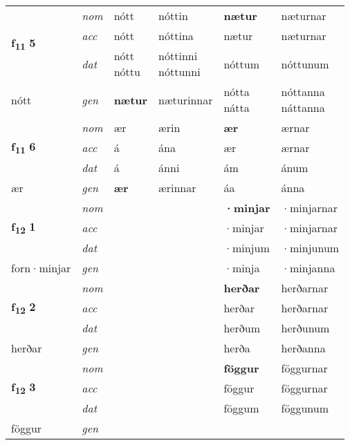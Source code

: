 \begin{longtable}[l]{X>{\footnotesize\itshape}XXXXX}
\multirow{3}{*}{{{\textbf{f{\textsubscript{11}}} \Large{\textbf{5}}}}} & nom & nótt & nóttin & \textbf{nætur} & næturnar \\*
 & acc & nótt & nóttina & nætur & næturnar \\*
 & dat & \specialcell{nótt\\ nóttu} & \specialcell{nóttinni\\ nóttunni} & nóttum & nóttunum \\*
 {\footnotesize{nótt}} & gen & \textbf{nætur} & næturinnar & \specialcell{nótta\\ nátta} & \specialcell{nóttanna\\ náttanna} \\
\cmidrule{1-6}

\multirow{3}{*}{{{\textbf{f{\textsubscript{11}}} \Large{\textbf{6}}}}} & nom & ær & ærin & \textbf{ær} & ærnar \\*
 & acc & á & ána & ær & ærnar \\*
 & dat & á & ánni & ám & ánum \\*
 {\footnotesize{ær}} & gen & \textbf{ær} & ærinnar & áa & ánna \\
\cmidrule{1-6}

\multirow{3}{*}{{{\textbf{f{\textsubscript{12}}} \Large{\textbf{1}}}}} & nom &  &  & \textbf{·minjar} & ·minjarnar \\*
 & acc &  &  & ·minjar & ·minjarnar \\*
 & dat &  &  & ·minjum & ·minjunum \\*
 {\footnotesize{forn\allowbreak ·minjar}} & gen & \textbf{} &  & ·minja & ·minjanna \\
\cmidrule{1-6}

\multirow{3}{*}{{{\textbf{f{\textsubscript{12}}} \Large{\textbf{2}}}}} & nom &  &  & \textbf{herðar} & herðarnar \\*
 & acc &  &  & herðar & herðarnar \\*
 & dat &  &  & herðum & herðunum \\*
 {\footnotesize{herðar}} & gen & \textbf{} &  & herða & herðanna \\
\cmidrule{1-6}

\multirow{3}{*}{{{\textbf{f{\textsubscript{12}}} \Large{\textbf{3}}}}} & nom &  &  & \textbf{föggur} & föggurnar \\*
 & acc &  &  & föggur & föggurnar \\*
 & dat &  &  & föggum & föggunum \\*
 {\footnotesize{föggur}} & gen & \textbf{} &  &  &  \\
\cmidrule{1-6}


\end{longtable}
